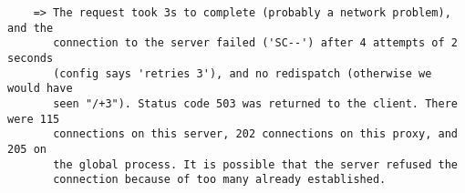 \begin{verbatim}
    => The request took 3s to complete (probably a network problem), and the
       connection to the server failed ('SC--') after 4 attempts of 2 seconds
       (config says 'retries 3'), and no redispatch (otherwise we would have
       seen "/+3"). Status code 503 was returned to the client. There were 115
       connections on this server, 202 connections on this proxy, and 205 on
       the global process. It is possible that the server refused the
       connection because of too many already established.
\end{verbatim}

